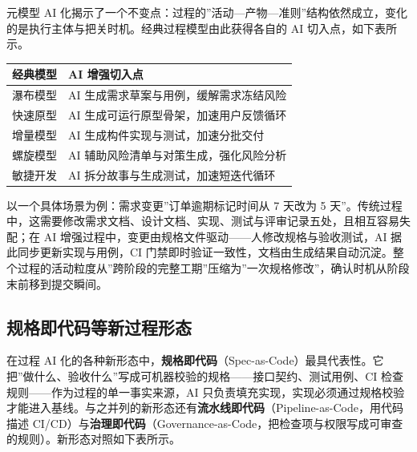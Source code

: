 \documentclass[12pt,a4paper,twoside,openany]{ctexbook}
\numberwithin{figure}{chapter}
\numberwithin{table}{chapter}
\newcounter{none}
\begin{document}
元模型 AI
化揭示了一个不变点：过程的''活动---产物---准则''结构依然成立，变化的是执行主体与把关时机。经典过程模型由此获得各自的
AI 切入点，如下表所示。

{\def\LTcaptype{none} %
\begin{longtable}[]{@{}ll@{}}
\toprule\noalign{}
经典模型 & AI 增强切入点 \\
\midrule\noalign{}
\endhead
\bottomrule\noalign{}
\endlastfoot
瀑布模型 & AI 生成需求草案与用例，缓解需求冻结风险 \\
快速原型 & AI 生成可运行原型骨架，加速用户反馈循环 \\
增量模型 & AI 生成构件实现与测试，加速分批交付 \\
螺旋模型 & AI 辅助风险清单与对策生成，强化风险分析 \\
敏捷开发 & AI 拆分故事与生成测试，加速短迭代循环 \\
\end{longtable}
}

以一个具体场景为例：需求变更''订单逾期标记时间从 7 天改为 5
天''。传统过程中，这需要修改需求文档、设计文档、实现、测试与评审记录五处，且相互容易失配；在
AI 增强过程中，变更由规格文件驱动------人修改规格与验收测试，AI
据此同步更新实现与用例，CI
门禁即时验证一致性，文档由生成结果自动沉淀。整个过程的活动粒度从''跨阶段的完整工期''压缩为''一次规格修改''，确认时机从阶段末前移到提交瞬间。

\subsection{规格即代码等新过程形态}\label{ux89c4ux683cux5373ux4ee3ux7801ux7b49ux65b0ux8fc7ux7a0bux5f62ux6001}

在过程 AI
化的各种新形态中，\textbf{规格即代码}（Spec-as-Code）最具代表性。它把''做什么、验收什么''写成可机器校验的规格------接口契约、测试用例、CI
检查规则------作为过程的单一事实来源，AI
只负责填充实现，实现必须通过规格校验才能进入基线。与之并列的新形态还有\textbf{流水线即代码}（Pipeline-as-Code，用代码描述
CI/CD）与\textbf{治理即代码}（Governance-as-Code，把检查项与权限写成可审查的规则）。新形态对照如下表所示。
\end{document}
